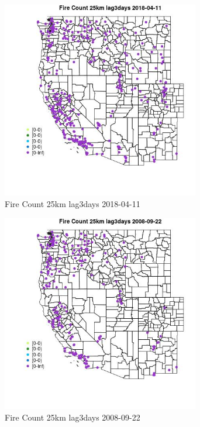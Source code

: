 \begin{figure} 
\centering  
\includegraphics[width=0.77\textwidth]{Code_Outputs/Report_ML_input_PM25_Step4_part_e_de_duplicated_aves_compiled_2019-05-18wNAs_MapObsFire_Count_25km_lag3days2018-04-11.jpg} 
\caption{\label{fig:Report_ML_input_PM25_Step4_part_e_de_duplicated_aves_compiled_2019-05-18wNAsMapObsFire_Count_25km_lag3days2018-04-11}Fire Count 25km lag3days 2018-04-11} 
\end{figure} 
 

\begin{figure} 
\centering  
\includegraphics[width=0.77\textwidth]{Code_Outputs/Report_ML_input_PM25_Step4_part_e_de_duplicated_aves_compiled_2019-05-18wNAs_MapObsFire_Count_25km_lag3days2008-09-22.jpg} 
\caption{\label{fig:Report_ML_input_PM25_Step4_part_e_de_duplicated_aves_compiled_2019-05-18wNAsMapObsFire_Count_25km_lag3days2008-09-22}Fire Count 25km lag3days 2008-09-22} 
\end{figure} 
 

